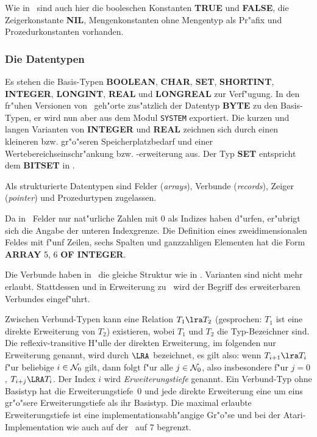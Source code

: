 Wie in \modula\ sind auch hier die booleschen Konstanten {\bf TRUE} und {\bf FALSE},
die Zeigerkonstante {\bf NIL}, Mengenkonstanten ohne Mengentyp als Pr"afix und
Prozedurkonstanten vorhanden.

\subsubsection{Die Datentypen}
\label{Datentypen}

Es stehen die Basis-Typen {\bf BOOLEAN}, {\bf CHAR}, {\bf SET}, {\bf SHORTINT},
{\bf INTEGER}, {\bf LONGINT}, {\bf REAL} und {\bf LONGREAL} zur
Verf"ugung.
In den fr"uhen Versionen von \oberon\ geh"orte zus"atzlich der Datentyp
{\bf BYTE} zu den Basis-Typen, er wird nun aber aus dem Modul {\tt SYSTEM}
exportiert.
Die kurzen und langen Varianten von {\bf INTEGER} und {\bf REAL} zeichnen sich
durch einen kleineren bzw. gr"o"seren Speicherplatzbedarf und einer
Wertebereichseinschr"ankung bzw. -erweiterung aus.
Der Typ {\bf SET} entspricht dem {\bf BITSET} in \modula.

\medskip
Als strukturierte Datentypen sind Felder ({\it arrays}), Verbunde ({\it records}),
Zeiger ({\it pointer}) und Prozedurtypen zugelassen.

Da in \oberon\ Felder nur nat"urliche Zahlen mit 0 als Indizes haben d"urfen,
er"ubrigt sich die Angabe der unteren Indexgrenze.
Die Definition eines zweidimensionalen Feldes mit f"unf Zeilen, sechs Spalten
und ganzzahligen Elementen hat die Form
{\bf ARRAY} 5, 6 {\bf OF INTEGER}.

\medskip
Die Verbunde haben in \oberon\ die gleiche Struktur wie in \modula.
Varianten sind nicht mehr erlaubt.
Stattdessen und in Erweiterung zu \modula\ wird der Begriff des
erweiterbaren Verbundes eingef"uhrt.

Zwischen Verbund-Typen kann eine Relation $T_1\lra T_2$ (gesprochen: $T_1$ ist
eine direkte Erweiterung von $T_2$) existieren, wobei $T_1$ und $T_2$ die Typ-Bezeichner
sind.
Die reflexiv-transitive H"ulle der direkten Erweiterung, im folgenden nur Erweiterung
genannt, wird durch $\LRA$ bezeichnet, es
gilt also: wenn $T_{i+1}\lra T_i$ f"ur beliebige $i\in{\cal N}_0$ gilt, dann
folgt f"ur alle $j\in{\cal N}_0$, also insbesondere f"ur $j=0$,
$T_{i+j}\LRA T_i$.
Der Index $i$ wird {\em Erweiterungstiefe\/} genannt.
Ein Verbund-Typ ohne Basistyp hat die Erweiterungstiefe~0 und
jede direkte Erweiterung eine um eins gr"o"sere Erweiterungstiefe als
ihr Basistyp.
Die maximal erlaubte Erweiterungstiefe ist eine implementationsabh"angige
Gr"o"se und bei der Atari-Implementation wie auch auf der \ceres\ auf 7
begrenzt.

